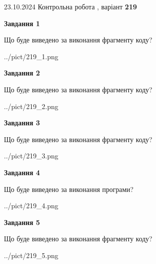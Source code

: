 \documentclass[12pt, ukrainian]{article}
\begin{document}
{\Large{23.10.2024 Контрольна робота , варіант  \No \textbf { 219 }\par}}
{
\begin {large}
{\begin {center}\textbf{Завдання 1}\end {center}}

Що буде виведено за виконання фрагменту коду?\par
\begin{center}
	{../pict/219_1.png}
\end{center}
\newpage

{\begin {center}\textbf{Завдання 2}\end {center}}

Що буде виведено за виконання фрагменту коду?\par
\begin{center}
	{../pict/219_2.png}
\end{center}
\newpage

{\begin {center}\textbf{Завдання 3}\end {center}}

Що буде виведено за виконання фрагменту коду?\par
\begin{center}
	{../pict/219_3.png}
\end{center}
\newpage

{\begin {center}\textbf{Завдання 4}\end {center}}

Що буде виведено за виконання програми?\par
\begin{center}
	{../pict/219_4.png}
\end{center}
\newpage

{\begin {center}\textbf{Завдання 5}\end {center}}

Що буде виведено за виконання фрагменту коду?\par
\begin{center}
	{../pict/219_5.png}
\end{center}
\newpage


\end{large}}
\end{document}
